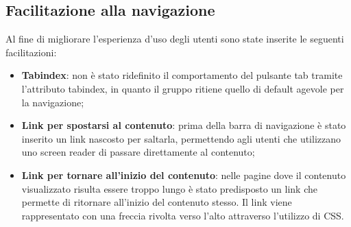 \subsection{Facilitazione alla navigazione}
Al fine di migliorare l'esperienza d'uso degli utenti sono state inserite le seguenti facilitazioni:
\begin{itemize}
	\item \textbf{Tabindex}: non è stato ridefinito il comportamento del pulsante tab tramite l'attributo tabindex, in quanto il gruppo ritiene quello di default agevole per la navigazione;
	\item \textbf{Link per spostarsi al contenuto}: prima della barra di navigazione è stato inserito un link nascosto per saltarla, permettendo agli utenti che utilizzano uno screen reader di passare direttamente al contenuto;
	\item \textbf{Link per tornare all'inizio del contenuto}: nelle pagine dove il contenuto visualizzato risulta essere troppo lungo è stato predisposto un link che permette di ritornare all'inizio del contenuto stesso. Il link viene rappresentato con una freccia rivolta verso l'alto attraverso l'utilizzo di CSS.
\end{itemize}
\newpage